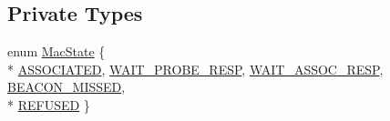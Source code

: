 \subsection*{Private Types}
\begin{DoxyCompactItemize}
\item 
enum \hyperlink{classns3_1_1StaWifiMac_a262848fcb2046037198bd36fa86fbd2c}{Mac\+State} \{ \\*
\hyperlink{classns3_1_1StaWifiMac_a262848fcb2046037198bd36fa86fbd2caa06dbd19272a71d7f2286202085f5f9f}{A\+S\+S\+O\+C\+I\+A\+T\+ED}, 
\hyperlink{classns3_1_1StaWifiMac_a262848fcb2046037198bd36fa86fbd2ca2cc58d1d1fd2ffb7cbf772e2ae606f13}{W\+A\+I\+T\+\_\+\+P\+R\+O\+B\+E\+\_\+\+R\+E\+SP}, 
\hyperlink{classns3_1_1StaWifiMac_a262848fcb2046037198bd36fa86fbd2cae21481c68081ea41e6ea065623ecc48b}{W\+A\+I\+T\+\_\+\+A\+S\+S\+O\+C\+\_\+\+R\+E\+SP}, 
\hyperlink{classns3_1_1StaWifiMac_a262848fcb2046037198bd36fa86fbd2cab6195e8c7a4f7920400d51b3bc5e69b7}{B\+E\+A\+C\+O\+N\+\_\+\+M\+I\+S\+S\+ED}, 
\\*
\hyperlink{classns3_1_1StaWifiMac_a262848fcb2046037198bd36fa86fbd2caa29ebdf6163b78af500f1af4deba143a}{R\+E\+F\+U\+S\+ED}
 \}
\end{DoxyCompactItemize}
